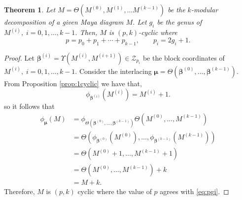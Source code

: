 \documentclass{amsart}
\newtheorem{theorem}{Theorem}
\theoremstyle{definition}
\newcommand{\Z}{\mathbb{Z}}
\newcommand{\bbeta}{{\boldsymbol{\beta}}}
\newcommand{\bmu}{{\boldsymbol{\mu}}}
\newcommand{\cM}{\mathcal{M}}
\newcommand{\cZ}{\mathcal{Z}}
\begin{document}
\begin{theorem}
  \label{thm:Mp}
  Let $M=\Theta\left(M^{(0)}, M^{(1)},\ldots M^{(k-1)}\right)$ be the $k$-modular decomposition of a given Maya diagram $M$.  Let $g_i$ be the genus
  of $M^{(i)},\; i=0,1,\ldots, k-1$.  Then, $M$ is $(p,k)$-cyclic where
  \begin{equation}
    \label{eq:pgi}
    p = p_0+p_1+\cdots + p_{k-1},\qquad p_i = 2g_i + 1.
  \end{equation}
\end{theorem}
\begin{proof}
  Let $\bbeta^{(i)}=\Upsilon\left(M^{(i)},M^{(i+1)}\right) \in \cZ_{p_i}$ be the block
  coordinates of $M^{(i)},\; i=0,1,\ldots, k-1$.  Consider the interlacing
  $\bmu = \Theta\left(\bbeta^{(0)}, \ldots , \bbeta^{(k-1)}\right)$.  From
  Proposition \ref{prop:1cyclic} we have that,
  \[ \phi_{\bbeta^{(i)}}\left( M^{(i)}\right)= M^{(i)} +1.\]
  so it follows that
  \begin{align*}
    \phi_{\bmu}(M)&= \phi_{\Theta\left(\bbeta^{(0)}, \ldots , \bbeta^{(k-1)}\right)}\Theta\left( M^{(0)} , \ldots ,
                  M^{(k-1)}\right) \\   
    &= \Theta\left( \phi_{\bbeta^{(0)}}(M^{(0)}) , \ldots ,
                    \phi_{\bbeta^{(k-1)}}(M^{(k-1)})\right) \\
                  &= \Theta\left(M^{(0)}+1 , \ldots , M^{(k-1)} + 1\right) \\
                  &= \Theta\left(M^{(0)}, \ldots , M^{(k-1)}\right) + k \\
                  &= M+k.
  \end{align*}
  Therefore, $M$ is $(p,k)$ cyclic where the value of $p$ agrees with
  \eqref{eq:pgi}.
\end{proof}
\end{document}
